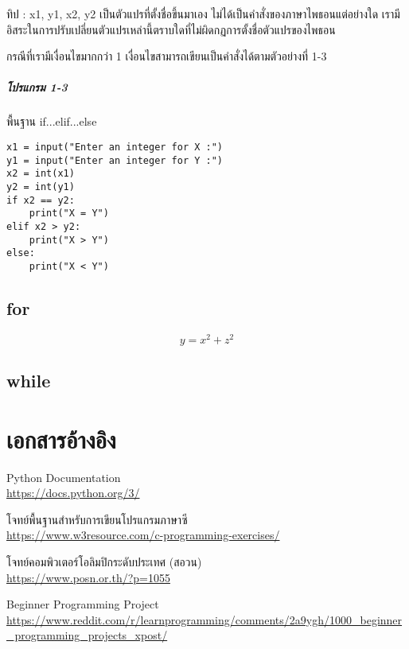 \documentclass[17pt,fancychapters]{report}
\begin{document}
ทิป : x1, y1, x2, y2 เป็นตัวแปรที่ตั้งชื่อขึ้นมาเอง ไม่ได้เป็นคำสั่งของภาษาไพธอนแต่อย่างใด เรามีอิสระในการปรับเปลี่ยนตัวแปรเหล่านี้ตราบใดที่ไม่ผิดกฏการตั้งชื่อตัวแปรของไพธอน

กรณีที่เรามีเงื่อนไขมากกว่า 1 เงื่อนไขสามารถเขียนเป็นคำสั่งได้ตามตัวอย่างที่ 1-3
\paragraph{โปรแกรม 1-3} พื้นฐาน if...elif...else
\begin{lstlisting}[style=python]
x1 = input("Enter an integer for X :")
y1 = input("Enter an integer for Y :")
x2 = int(x1)
y2 = int(y1)
if x2 == y2:
	print("X = Y")
elif x2 > y2:
	print("X > Y")
else:
	print("X < Y")
\end{lstlisting}

\section{for}

\begin{equation}
y = x^2 + z^2
\end{equation}
\section{while}


\chapter{เอกสารอ้างอิง}

\noindent Python Documentation \\
\url{https://docs.python.org/3/}

\hfill 

\noindent โจทย์พื้นฐานสำหรับการเขียนโปรแกรมภาษาซี \\
\url{https://www.w3resource.com/c-programming-exercises/}

\hfill

\noindent โจทย์คอมพิวเตอร์โอลิมปิกระดับประเทศ (สอวน) \\
\url{https://www.posn.or.th/?p=1055}

\hfill

\noindent Beginner Programming Project \\
\url{https://www.reddit.com/r/learnprogramming/comments/2a9ygh/1000_beginner_programming_projects_xpost/}
\end{document}
